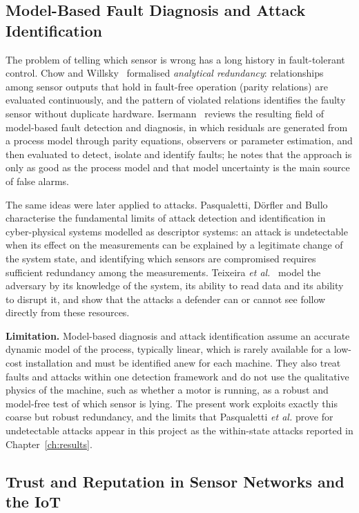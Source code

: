 \subsection{Model-Based Fault Diagnosis and Attack Identification}

The problem of telling which sensor is wrong has a long history in fault-tolerant control. Chow and Willsky~\cite{chow1984redundancy} formalised \emph{analytical redundancy}: relationships among sensor outputs that hold in fault-free operation (parity relations) are evaluated continuously, and the pattern of violated relations identifies the faulty sensor without duplicate hardware. Isermann~\cite{isermann2005fdd} reviews the resulting field of model-based fault detection and diagnosis, in which residuals are generated from a process model through parity equations, observers or parameter estimation, and then evaluated to detect, isolate and identify faults; he notes that the approach is only as good as the process model and that model uncertainty is the main source of false alarms.

The same ideas were later applied to attacks. Pasqualetti, D\"orfler and Bullo~\cite{pasqualetti2013identification} characterise the fundamental limits of attack detection and identification in cyber-physical systems modelled as descriptor systems: an attack is undetectable when its effect on the measurements can be explained by a legitimate change of the system state, and identifying which sensors are compromised requires sufficient redundancy among the measurements. Teixeira \emph{et al.}~\cite{teixeira2015secure} model the adversary by its knowledge of the system, its ability to read data and its ability to disrupt it, and show that the attacks a defender can or cannot see follow directly from these resources.

\textbf{Limitation.} Model-based diagnosis and attack identification assume an accurate dynamic model of the process, typically linear, which is rarely available for a low-cost installation and must be identified anew for each machine. They also treat faults and attacks within one detection framework and do not use the qualitative physics of the machine, such as whether a motor is running, as a robust and model-free test of which sensor is lying. The present work exploits exactly this coarse but robust redundancy, and the limits that Pasqualetti \emph{et al.} prove for undetectable attacks appear in this project as the within-state attacks reported in Chapter~\ref{ch:results}.

\subsection{Trust and Reputation in Sensor Networks and the IoT}

